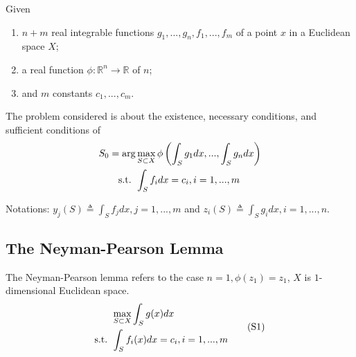 \documentclass[11pt]{elegantbook}
\begin{document}
Given
\begin{enumerate}[$\circ$]
    \item $n+m$ real integrable functions $g_1,...,g_n, f_1,...,f_m$ of a point $x$ in a Euclidean space $X$;
    \item a real function $\phi: \mathbb{R}^n \rightarrow \mathbb{R}$ of $n$;
    \item and $m$ constants $c_1,...,c_m$.
\end{enumerate}
The problem considered is about the existence, necessary conditions, and sufficient conditions of
\begin{equation}
    \begin{aligned}
        S_0=\arg&\max_{S\subset X}\phi\left(\int_Sg_1 dx,...,\int_Sg_n dx\right)\\
        \textnormal{s.t. }&\int_S f_i dx=c_i, i=1,...,m
    \end{aligned}
    \nonumber
\end{equation}

Notations: $y_j(S)\triangleq\int_S f_j dx, j=1,...,m$ and $z_i(S)\triangleq \int_S g_i dx, i=1,...,n$.

\subsection{The Neyman-Pearson Lemma}
The Neyman-Pearson lemma refers to the case $n=1,\phi(z_1)=z_1$, $X$ is $1$-dimensional Euclidean space.
\begin{equation}
    \begin{aligned}
        &\max_{S\subset X}\int_Sg(x) dx\\
        \textnormal{s.t. }&\int_S f_i(x) dx=c_i, i=1,...,m
    \end{aligned}
    \tag{S1}
    \label{S1}
\end{equation}
\end{document}
